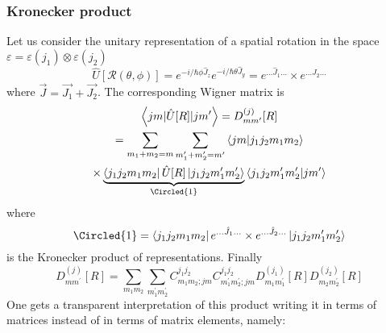 \documentclass[12pt]{article}
\newcommand{\be}{\begin{equation}}
\newcommand{\ee}{\end{equation}}
\begin{document}
\subsubsection{Kronecker product}
\setcounter{equation}{125}

Let us consider the unitary representation of a spatial
rotation in the space \(\varepsilon=\varepsilon\left(j_{1}\right) \otimes \varepsilon\left(j_{2}\right)\)
\be
\hat{U}[\mathcal{R}(\theta, \phi)]=e^{-i / \hbar \phi \hat{J}_{z}} e^{-i / \hbar \theta \hat{J}_{y}}=e^{\ldots \hat{J}_{1} \ldots} \times e^{\ldots \hat{J}_{2} \ldots}
\ee
where $\vec{J} = \vec{J_1} + \vec{J_2}$.
The corresponding Wigner matrix is
\[
\begin{gathered}
\left\langle j m|\hat{U}[R]| j m^{\prime}\right\rangle=D_{m m^{\prime}}^{(j)}[R]\\
=
\sum_{m_1+m_2=m}\sum_{m_1^\prime+m_2^\prime=m^\prime}\bra{jm}\ket{j_1j_2m_1m_2}\\
\times
\underbrace{\bra{j_1j_2m_1m_2}\hat{U}[R]\ket{j_1j_2m_1^\prime m_2^\prime}}%
_{\Circled{1}}
\bra{j_1j_2m_1^\prime m_2^\prime}\ket{jm^\prime}
\end{gathered}
\]
where
\[
\Circled{1} = 
\bra{j_1j_2m_1m_2} 
e^{\ldots \hat{J}_{1} \ldots} \times e^{\ldots \hat{J}_{2} \ldots}
\ket{j_1j_2m_1^\prime m_2^\prime}
\]
is the Kronecker product of representations. Finally
\be
D^{(j)}_{mm^\prime}[R] =
\sum_{m_1m_2}\sum_{m_1^\prime m_2^\prime}
C^{j_1j_2}_{m_1m_2;jm}
C^{j_1j_2}_{m_1^\prime m_2^\prime;jm}
D^{(j_1)}_{m_1m_1^\prime}[R]
D^{(j_2)}_{m_2m_2^\prime}[R]
\label{eq:g127}
\ee
One gets a transparent interpretation of this product
writing it in terms of matrices instead of in terms
of matrix elements, namely:
\end{document}
